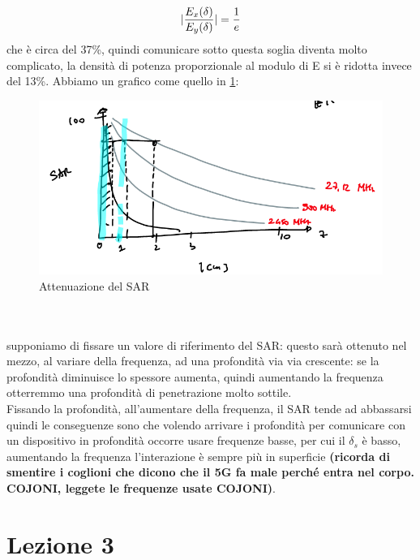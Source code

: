 \documentclass[oneside, 12pt]{extbook}
\DeclarePairedDelimiter{\abs}{\lvert}{\rvert}
\begin{document}
\begin{equation}
	\abs{\dfrac{E_x(\delta)}{E_y(\delta)}} = \frac{1}{e}
\end{equation}
che è circa del 37\%, quindi comunicare sotto questa soglia diventa molto complicato, la densità di potenza proporzionale al modulo di E si è ridotta invece del 13\%. Abbiamo un grafico come quello in \ref{sar_att}:
\begin{figure}[!h]
	\includegraphics[scale=0.5]{immagini/attenuazione_sar.png}
	\caption{Attenuazione del SAR}
	\label{sar_att}
\end{figure}
\\\\supponiamo di fissare un valore di riferimento del SAR: questo sarà ottenuto nel mezzo, al variare della frequenza, ad una profondità via via crescente: se la profondità diminuisce lo spessore aumenta, quindi aumentando la frequenza otterremmo una profondità di penetrazione molto sottile.\\Fissando la profondità, all'aumentare della frequenza, il SAR tende ad abbassarsi quindi le conseguenze sono che volendo arrivare i profondità per comunicare con un dispositivo in profondità occorre usare frequenze basse, per cui il $\delta_s$ è basso, aumentando la frequenza l'interazione è sempre più in superficie \textbf{\textsf{(ricorda di smentire i coglioni che dicono che il 5G fa male perché entra nel corpo. COJONI, leggete le frequenze usate COJONI)}}.

\chapter{Lezione 3}
\end{document}
